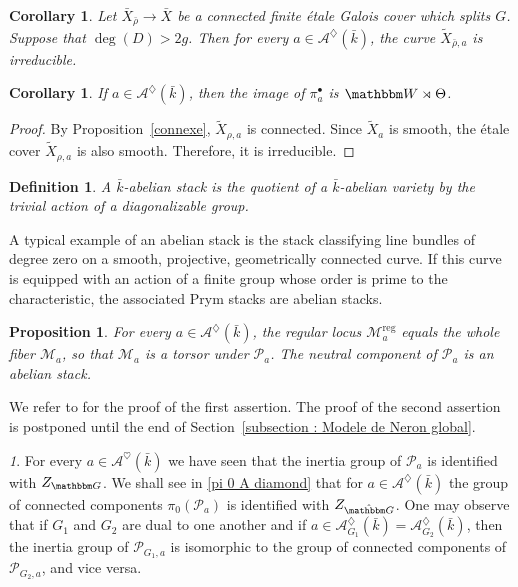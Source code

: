 \documentclass[12pt,english]{smfart}
\numberwithin{equation}{subsection}
\newtheorem{proposition}[equation]{Proposition}
\newtheorem{definition}[equation]{Definition}
\newtheorem{corollary}[equation]{Corollary}
\theoremstyle{remark}
\newtheorem{numero}[equation]{}
\newcommand\calA{{\mathscr A}}
\newcommand\calP{{\mathscr P}}
\newcommand\GG{{\mathbbm G}}
\newcommand\bbW{{\mathbbm W}}
\begin{document}
\begin{corollary}\label{irreductible}
Let $\bar{X}_{\bar{\rho}}\rightarrow \bar{X}$ be a connected finite \'etale Galois cover which splits $G$.
Suppose that $\deg(D)>2g$. Then for every $a\in \mathcal{A}^\diamondsuit(\bar{k})$, the curve $\widetilde{X}_{\bar{\rho},a}$ is irreducible.
\end{corollary}

\begin{corollary}\label{image pi a diamond}
If $a\in\calA^\diamondsuit(\bar k)$, then the image of $\pi_a^\bullet$ is $\bbW\rtimes\Theta$.
\end{corollary}

\begin{proof}
By Proposition~\ref{connexe}, $\widetilde{X}_{\rho,a}$ is connected. Since $\widetilde{X}_a$ is smooth,
the \'etale cover $\widetilde{X}_{\rho,a}$ is also smooth. Therefore, it is irreducible.
\end{proof}

\begin{definition}
A $\bar k$-\emph{abelian stack} is the quotient of a $\bar k$-abelian variety by the trivial action of a diagonalizable group.
\end{definition}

A typical example of an abelian stack is the stack classifying line bundles of degree zero on a smooth,
projective, geometrically connected curve. If this curve is equipped with an action of a finite group whose order
is prime to the characteristic, the associated Prym stacks are abelian stacks.

\begin{proposition}\label{A lozenge}
For every $a\in \mathcal{A}^\diamondsuit(\bar{k})$, the regular locus $\mathcal{M}^\mathrm{reg}_a$ equals the whole fiber $\mathcal{M}_a$,
so that $\mathcal{M}_a$ is a torsor under $\mathcal{P}_a$. The neutral component of $\mathcal{P}_a$ is an abelian stack.
\end{proposition}

We refer to \cite[Proposition~4.2]{N} for the proof of the first assertion. The proof of the second assertion is postponed until the end of Section~\ref{subsection : Modele de Neron global}.

\begin{numero}
For every $a\in\calA^\heartsuit(\bar k)$ we have seen that the inertia group of $\calP_a$ is identified with $Z_\GG$. We shall see in \ref{pi 0 A diamond} that for $a\in\calA^\diamondsuit(\bar k)$ the group of connected components $\pi_0(\calP_a)$ is identified with $Z_{\hat\GG}$. One may observe that if $G_1$ and $G_2$ are dual to one another and if $a\in\calA^\diamondsuit_{G_1}(\bar k)=\calA^\diamondsuit_{G_2}(\bar k)$, then the inertia group of $\calP_{G_1,a}$ is isomorphic to the group of connected components of $\calP_{G_2,a}$, and vice versa.
\end{numero}
\end{document}
